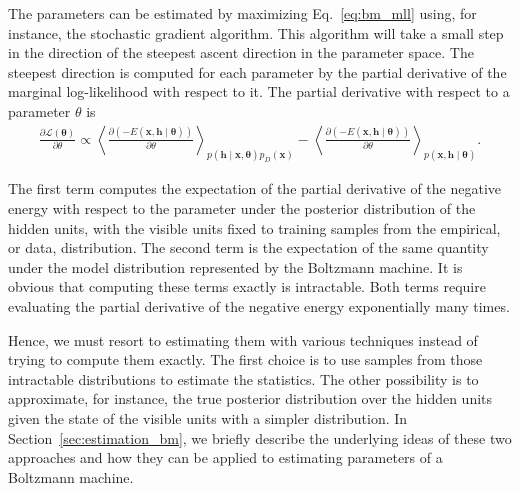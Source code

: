 \documentclass[dissertation,nocontribution,draft*]{aaltoseries}
\newcommand{\vect}[1]{\mathbf{#1}}
\newcommand{\vects}[1]{\boldsymbol{#1}}
\newcommand{\vh}[0]{\vect{h}}
\newcommand{\vx}[0]{\vect{x}}
\newcommand{\TT}[0]{{\vects{\theta}}}
\newcommand{\LL}[0]{\mathcal{L}}
\begin{document}
The parameters can be estimated by maximizing
Eq.~\eqref{eq:bm_mll} using, for instance, the stochastic
gradient  algorithm. This algorithm will take a small step
in the direction of the steepest ascent direction in the
parameter space. The steepest direction is computed for each
parameter by the partial derivative of the marginal
log-likelihood with respect to it. The partial derivative
with respect to a parameter $\theta$ is 
\begin{align}
    \label{eq:bm_grad}
    \frac{\partial \LL(\TT)}{\partial \theta} \propto
    \left< \frac{\partial
    \left(-E(\vx, \vh\mid\TT)\right)}{\partial \theta}
    \right>_{p\left(\vh \mid \vx,
    \TT\right)p_D\left(\vx\right) } 
    -
    \left< \frac{\partial
    \left(-E(\vx, \vh\mid\TT)\right)}{\partial \theta}
    \right>_{p\left(\vx, \vh \mid \TT\right)}.
\end{align}

The first term computes the expectation of the
partial derivative of the negative energy with respect to
the parameter under the posterior distribution of the hidden
units, with the visible units fixed to training samples from
the empirical, or data, distribution. The
second term is the expectation of the same quantity under
the model distribution represented by the Boltzmann machine.
It is obvious that computing these terms exactly is
intractable. Both terms require evaluating the
partial derivative of the negative energy exponentially many
times. 

Hence, we must resort to estimating them with various
techniques instead of trying to compute them exactly. The
first choice is to use 
samples from those intractable distributions to estimate the
statistics. The other possibility is to approximate, for
instance, the true posterior distribution over the hidden
units given the state of the visible units with a simpler
distribution. In Section~\ref{sec:estimation_bm}, we briefly
describe the underlying ideas of these two approaches and
how they can be applied to estimating parameters of a
Boltzmann machine. 
\end{document}
